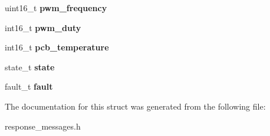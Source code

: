 \begin{DoxyCompactItemize}
\item 
uint16\+\_\+t {\bfseries pwm\+\_\+frequency}\hypertarget{structControlResponse_abcbc48206cf93810547848b6042b39f0}{}\label{structControlResponse_abcbc48206cf93810547848b6042b39f0}

\item 
int16\+\_\+t {\bfseries pwm\+\_\+duty}\hypertarget{structControlResponse_abeb5c1b5e5fed33dcfb6595b06ad8d1b}{}\label{structControlResponse_abeb5c1b5e5fed33dcfb6595b06ad8d1b}

\item 
int16\+\_\+t {\bfseries pcb\+\_\+temperature}\hypertarget{structControlResponse_ad11ecc5814970e9b7a3f0d9471d07ae1}{}\label{structControlResponse_ad11ecc5814970e9b7a3f0d9471d07ae1}

\item 
state\+\_\+t {\bfseries state}\hypertarget{structControlResponse_af726a4b6a342d214b606a048ed070989}{}\label{structControlResponse_af726a4b6a342d214b606a048ed070989}

\item 
fault\+\_\+t {\bfseries fault}\hypertarget{structControlResponse_a73672473e86060a346b0d55d3c1ac62d}{}\label{structControlResponse_a73672473e86060a346b0d55d3c1ac62d}

\end{DoxyCompactItemize}


The documentation for this struct was generated from the following file\+:\begin{DoxyCompactItemize}
\item 
response\+\_\+messages.\+h\end{DoxyCompactItemize}

